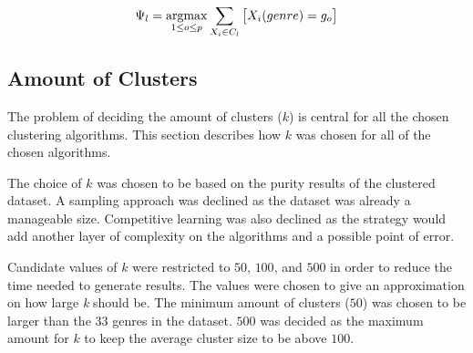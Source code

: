 \documentclass[../report.tex]{subfiles}
\begin{document}
\begin{equation}
  \Psi_{l} = \operatorname*{argmax}_{1 \leq o \leq p} \sum_{X_i \in C_l}{\big[X_i (genre) = g_o\big]}
  \label{eq:purity_truth}
\end{equation}



\subsection{Amount of Clusters}
The problem of deciding the amount of clusters ($k$) is central for all the chosen clustering algorithms. This section describes how $k$ was chosen for all of the chosen algorithms.

The choice of $k$ was chosen to be based on the purity results of the clustered dataset. A sampling approach was declined as the dataset was already a manageable size. Competitive learning was also declined as the strategy would add another layer of complexity on the algorithms and a possible point of error.


Candidate values of $k$ were restricted to $50$, $100$, and $500$ in order to reduce the time needed to generate results. The values were chosen to give an approximation on how large \textit{k} should be. The minimum amount of clusters ($50$) was chosen to be larger than the $33$ genres in the dataset. $500$ was decided as the maximum amount for $k$ to keep the average cluster size to be above $100$.



\end{document}
